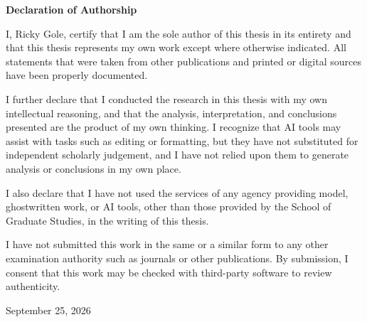 \begin{frontmatterpage}
  \doublespacing
  {\centering\normalsize\bfseries Declaration of Authorship\par}

  \vspace{\baselineskip}

  I, Ricky Gole, certify that I am the sole author of this thesis in its
  entirety and that this thesis represents my own work except where otherwise
  indicated. All statements that were taken from other publications and printed
  or digital sources have been properly documented.

  I further declare that I conducted the research in this thesis with my own
  intellectual reasoning, and that the analysis, interpretation, and conclusions
  presented are the product of my own thinking. I recognize that AI tools may
  assist with tasks such as editing or formatting, but they have not substituted
  for independent scholarly judgement, and I have not relied upon them to
  generate analysis or conclusions in my own place.

  I also declare that I have not used the services of any agency providing
  model, ghostwritten work, or AI tools, other than those provided by the School
  of Graduate Studies, in the writing of this thesis.

  I have not submitted this work in the same or a similar form to any other
  examination authority such as journals or other publications. By submission, I
  consent that this work may be checked with third-party software to review
  authenticity.

  \vspace{2\baselineskip}

  \noindent September 25, 2026
\end{frontmatterpage}
